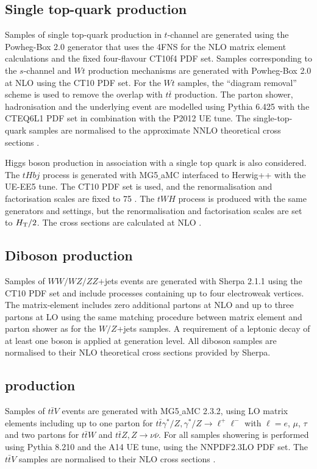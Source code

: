 \subsection{Single top-quark production}
Samples of single top-quark production in $t$-channel are generated using the {\sc Powheg-Box} 2.0 generator that uses the 4FNS for the NLO matrix element calculations and the fixed four-flavour CT10f4 PDF set. Samples corresponding to the $s$-channel and $Wt$ production mechanisms are generated with {\sc Powheg-Box} 2.0 at NLO using the CT10 PDF set. For the $Wt$ samples, the ``diagram removal'' scheme \cite{Frixione:2005vw} is used to remove the overlap with $t\bar{t}$ production. The parton shower, hadronisation and the underlying event are modelled using {\sc Pythia} 6.425 with the CTEQ6L1 PDF set in combination with the P2012 UE tune. The single-top-quark samples are normalised to the approximate NNLO theoretical cross sections \cite{Kidonakis:2011wy,Kidonakis:2010ux,Kidonakis:2010tc}.\par
Higgs boson production in association with a single top quark is also considered. The $tHbj$ process is generated with {\sc MG5$\_$aMC} interfaced to {\sc Herwig++} with the UE-EE5 tune. The CT10 PDF set is used, and the renormalisation and factorisation scales are fixed to 75 \gev. The $tWH$ process is produced with the same generators and settings, but the renormalisation and factorisation scales are set to $H_{\rm T}/2$. The cross sections are calculated at NLO \cite{Demartin:2015uha}.

\subsection{Diboson production}
Samples of $WW/WZ/ZZ$+jets events are generated with {\sc Sherpa} 2.1.1 using the CT10 PDF set and include processes containing up to four electroweak vertices. The matrix-element includes zero additional partons at NLO and up to three partons at LO using the same matching procedure between matrix element and parton shower as for the $W/Z$+jets samples. A requirement of a leptonic decay of at least one boson is applied at generation level. All diboson samples are normalised to their NLO theoretical cross sections provided by {\sc Sherpa}.

\subsection[$t\bar{t}V$ production]{ production}
Samples of $t\bar{t}V$ events are generated with {\sc MG5$\_$aMC} 2.3.2, using LO matrix elements including up to one parton for $t\bar{t}\gamma^{*}/Z,\gamma^{*}/Z\to \ell^{+}\ell^{-}$ with $\ell=e$, $\mu$, $\tau$ and two partons for $t\bar{t}W$ and $t\bar{t}Z,Z\to \nu\bar{\nu}$. For all samples showering is performed using {\sc Pythia} 8.210 and the A14 UE tune, using  the NNPDF2.3LO PDF set. The $t\bar{t}V$ samples are normalised to their NLO cross sections \cite{ttV1,ttV2}.

